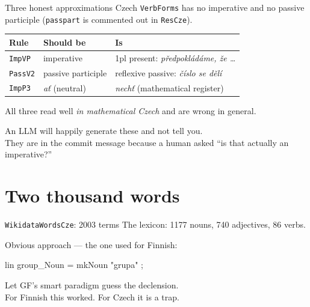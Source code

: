 \documentclass[10pt,aspectratio=169]{beamer}
\begin{document}
\begin{frame}{Three honest approximations}
  Czech \texttt{VerbForms} has no imperative and no passive participle
  (\texttt{passpart} is commented out in \texttt{ResCze}).

  \vspace{0.5em}
  \begin{center}
  \begin{tabular}{lll}
    \toprule
    \textbf{Rule} & \textbf{Should be} & \textbf{Is} \\
    \midrule
    \texttt{ImpVP} & imperative & 1pl present: \emph{předpokládáme, že \dots} \\
    \texttt{PassV2} & passive participle & reflexive passive: \emph{číslo se dělí} \\
    \texttt{ImpP3} & \emph{ať} (neutral) & \emph{nechť} (mathematical register) \\
    \bottomrule
  \end{tabular}
  \end{center}

  \vspace{1em}
  All three read well \emph{in mathematical Czech} and are wrong in general.

  \vspace{0.5em}
  \alert{An LLM will happily generate these and not tell you.} \\
  They are in the commit message because a human asked ``is that actually an imperative?''
\end{frame}

\section{Two thousand words}

\begin{frame}{\texttt{WikidataWordsCze}: 2003 terms}
  The lexicon: 1177 nouns, 740 adjectives, 86 verbs.

  \vspace{0.5em}
  Obvious approach --- the one used for Finnish:
\begin{center}\ttfamily\small
lin group\_Noun = mkNoun "grupa" ;
\end{center}

  \vspace{0.5em}
  Let GF's smart paradigm guess the declension. \\
  For Finnish this worked. For Czech it is a trap.
\end{frame}
\end{document}
